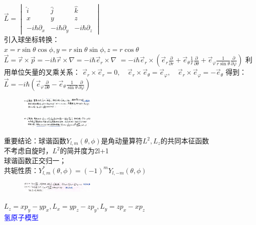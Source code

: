 \documentclass[a4paper,8pt]{extarticle} %
\newcommand{\bluetext}[1]{\textcolor{blue}{#1}}
\begin{document}
\begin{multicols}{3}
$\vec{L} = \begin{vmatrix} \hat{i} & \hat{j} & \hat{k} \\ x & y & z \\ -i\hbar\partial_x & -i\hbar\partial_y & -i\hbar\partial_z \end{vmatrix}$\\
引入球坐标转换：\\$x = r\sin\theta\cos\phi, y = r\sin\theta\sin\phi, z = r\cos\theta$\\
$\vec{L} = \vec{r} \times \vec{p} = -i\hbar\vec{r} \times \nabla = -i\hbar\vec{e}_r \times \nabla$
$= -i\hbar\vec{e}_r \times (\vec{e}_r \frac{\partial}{\partial r} + \vec{e}_\theta \frac{1}{r}\frac{\partial}{\partial \theta} + \vec{e}_\varphi \frac{1}{r\sin\theta}\frac{\partial}{\partial \varphi})$
利用单位矢量的叉乘关系：
$\vec{e}_r \times \vec{e}_r = 0, \quad \vec{e}_r \times \vec{e}_\theta = \vec{e}_\varphi, \quad \vec{e}_r \times \vec{e}_\varphi = -\vec{e}_\theta$
得到：
$\vec{L} = -i\hbar(\vec{e}_\varphi \frac{\partial}{\partial \theta} - \vec{e}_\theta \frac{1}{\sin\theta}\frac{\partial}{\partial \varphi})$
\begin{figure}[H]
    \centering
    \includegraphics[width=0.32\textwidth]{images/6.png}
    \vspace{-0.6cm}
\end{figure}
\begin{figure}[H]
    \centering
    \includegraphics[width=0.32\textwidth]{images/7.png}
    \vspace{-0.6cm}
\end{figure}
重要结论：球谐函数$Y_{l,m}(\theta,\phi)$是角动量算符$L^2,L_z$的共同本征函数\\
不考虑自旋时，$L^2$的简并度为2l+1\\
球谐函数正交归一；\\
共轭性质：$Y_{l,m}^*(\theta,\phi) = (-1)^mY_{l,-m}(\theta,\phi)$\\
\begin{figure}[H]
    \vspace{-0.5cm}
    \centering
    \includegraphics[width=0.32\textwidth]{images/8.png}
    \vspace{-0.6cm}
\end{figure}
$L_z=xp_y-yp_x,L_x=yp_z-zp_y,L_y=zp_x-xp_z$\\
\bluetext{氢原子模型}


\end{multicols}
\end{document}
